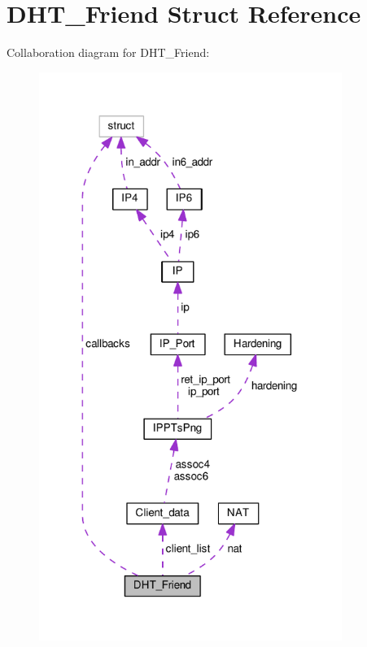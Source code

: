 \hypertarget{struct_d_h_t___friend}{\section{D\+H\+T\+\_\+\+Friend Struct Reference}
\label{struct_d_h_t___friend}
}


Collaboration diagram for D\+H\+T\+\_\+\+Friend\+:
\nopagebreak
\begin{figure}[H]
\begin{center}
\leavevmode
\includegraphics[width=279pt]{struct_d_h_t___friend__coll__graph}
\end{center}
\end{figure}
